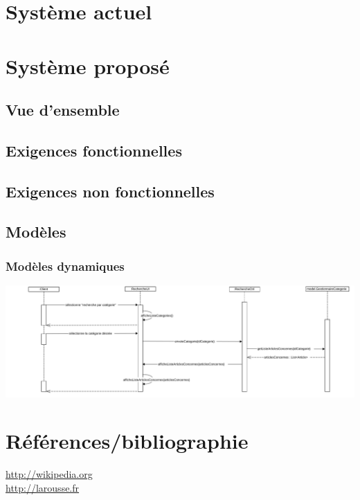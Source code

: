 \documentclass[a4paper,12pt,oneside]{report}
\begin{document}
	
	
	 \tableofcontents
	
	\chapter{Système actuel}
		\thispagestyle{document}
	\chapter{Système proposé}
		\thispagestyle{document}
		\section{Vue d'ensemble}
		\section{Exigences fonctionnelles}
		\section{Exigences non fonctionnelles}
		\section{Modèles}
			
			
			
			
			
			
			\subsection{Modèles dynamiques}
				\includegraphics[width=\textwidth]{sequence_diagrams/search_by_category.pdf}
	
	\pagestyle{glossary}
	\printglossary[title=Glossaire métier,toctitle=Glossaire métier]
	
	\chapter*{Références/bibliographie}
		\url{http://wikipedia.org} \\
		\url{http://larousse.fr} \\
\end{document}
